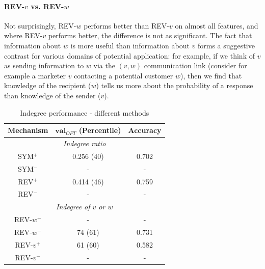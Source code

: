 \documentclass[conference]{IEEEtran}
\begin{document}
\paragraph{REV-$v$ vs. REV-$w$}
Not surprisingly, REV-$w$ performs better than REV-$v$ on almost all features, and where REV-$v$ performs better, 
the difference is not as significant.
The fact that information about $w$ is more useful than information
about $v$ forms a suggestive contrast for various domains of
potential application: for example, if we think of $v$ as sending 
information to $w$ via the $(v,w)$ communication link (consider for example
a marketer $v$ contacting a potential customer $w$), then we find
that knowledge of the recipient ($w$) tells us more about the 
probability of a response than knowledge of the sender ($v$).

\begin{table}[!t]
\renewcommand{\arraystretch}{1.3}
\caption{Indegree performance - different methods}
\label{table_recresults_indeg}
\centering
\begin{tabular}{|c||c|c|}
\hline
\bf{Mechanism} & $\mathbf{val}_{OPT}$ (Percentile) & \bf{Accuracy} \\
\hline
\multicolumn{3}{|c|}{\emph{Indegree ratio}} \\
\hline
SYM$^+$ & 0.256 (40) & 0.702 \\
SYM$^-$ & - & - \\
REV$^+$ & 0.414 (46) & 0.759 \\
REV$^-$ & - & - \\
\hline
\multicolumn{3}{|c|}{\emph{Indegree of $v$ or $w$}} \\
\hline
REV-$w^+$ & - & - \\
REV-$w^-$ & 74 (61) & 0.731 \\
REV-$v^+$ &  61 (60) & 0.582 \\
REV-$v^-$ & - & - \\
\hline
\end{tabular}
\end{table}
\end{document}
